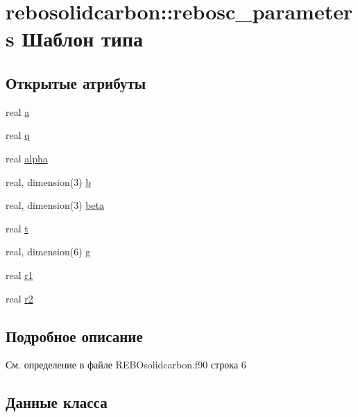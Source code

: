 \hypertarget{structrebosolidcarbon_1_1rebosc__parameters}{}\section{rebosolidcarbon\+:\+:rebosc\+\_\+parameters Шаблон типа}
\label{structrebosolidcarbon_1_1rebosc__parameters}
\subsection*{Открытые атрибуты}
\begin{DoxyCompactItemize}
\item 
real \mbox{\hyperlink{structrebosolidcarbon_1_1rebosc__parameters_aa039aa5587ec729ab93397a949fc5010}{a}}
\item 
real \mbox{\hyperlink{structrebosolidcarbon_1_1rebosc__parameters_a84abecd93d92c1648a1f540a70e0ef17}{q}}
\item 
real \mbox{\hyperlink{structrebosolidcarbon_1_1rebosc__parameters_ae6ab24cea55c11223a91557028079d3b}{alpha}}
\item 
real, dimension(3) \mbox{\hyperlink{structrebosolidcarbon_1_1rebosc__parameters_a5605bb505d0a1caffb29cbb7919c08bb}{b}}
\item 
real, dimension(3) \mbox{\hyperlink{structrebosolidcarbon_1_1rebosc__parameters_ac7403cf3daf2efb19e9c52d638521f71}{beta}}
\item 
real \mbox{\hyperlink{structrebosolidcarbon_1_1rebosc__parameters_a7e00bed4e7bf3535140ddae6ea9c0ad2}{t}}
\item 
real, dimension(6) \mbox{\hyperlink{structrebosolidcarbon_1_1rebosc__parameters_a551c084728b98d39807fcf81965d2930}{g}}
\item 
real \mbox{\hyperlink{structrebosolidcarbon_1_1rebosc__parameters_a158f14d0b9a2ca1ee41cd59b2f78c901}{r1}}
\item 
real \mbox{\hyperlink{structrebosolidcarbon_1_1rebosc__parameters_a3652210187bb250bcbf9ab2d3db9dc66}{r2}}
\end{DoxyCompactItemize}


\subsection{Подробное описание}


См. определение в файле R\+E\+B\+Osolidcarbon.\+f90 строка 6



\subsection{Данные класса}
\mbox{\label{structrebosolidcarbon_1_1rebosc__parameters_aa039aa5587ec729ab93397a949fc5010}} 
